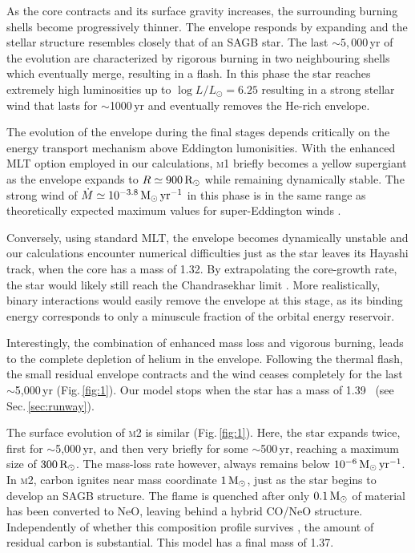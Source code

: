 \documentclass[../../main/thesis_msc.tex]{subfiles}
\begin{document}
As the core contracts and its surface gravity increases, the surrounding burning shells become progressively thinner. The envelope responds by expanding  and the stellar structure resembles closely that of an SAGB star.
The last $\sim 5,000$\,yr of the evolution are characterized by rigorous burning in two neighbouring shells which eventually merge, resulting in a  flash. In this phase the star reaches extremely high luminosities up to $\log{L/L_\odot = 6.25}$ resulting in a strong stellar wind that lasts for $\sim$1000\,yr and eventually removes the He-rich envelope.

The evolution of the envelope during the final stages 
depends critically on the energy transport mechanism above Eddington lumonisities. With the enhanced MLT option 
employed in our calculations, \textsc{m1} briefly 
becomes a yellow supergiant as the envelope  expands to $R\simeq 900\mathrm{\,R_\odot}$ while remaining dynamically stable.
The strong wind of $\dot{M}\simeq10^{-3.8}\mathrm{\,M_{\odot}\,yr^{-1}}$ in this phase is in the same range as theoretically expected maximum values for super-Eddington winds \citep[][]{Owocki:2004zz,Smith2006}.
%

Conversely, using standard MLT, the envelope becomes dynamically unstable and our calculations encounter numerical difficulties just as the star leaves its Hayashi track, when the core has a mass of 1.32\msun.
By extrapolating the core-growth rate, the star would likely still reach the  Chandrasekhar limit \citep[see ][for a similar conclusion]{Woosley:2019sdf}. 
More realistically, binary interactions would easily remove the envelope at this stage, as its binding energy corresponds to only a minuscule fraction of the orbital energy reservoir. 

Interestingly, the combination of enhanced mass loss and vigorous burning, leads to the complete depletion of helium in the envelope. 
Following the thermal flash, the small residual envelope contracts and the wind ceases completely for the last $\sim$5,000\,yr (Fig.\,\ref{fig:1}). Our model stops when the star has a mass of 1.39\msun~ (see Sec.\,\ref{sec:runway}).  

The surface evolution of \textsc{m2} is similar (Fig.\,\ref{fig:1}). Here, 
the star expands twice, first for $\sim$5,000\,yr, and then very briefly for some 
$\sim$500\,yr, reaching a maximum size of $300\mathrm{\,R_\odot}$. The mass-loss rate however, always remains 
below $10^{-6}\mathrm{\,M_{\odot}\,yr^{-1}}$. In \textsc{m2}, carbon ignites near mass coordinate $1\mathrm{\,M_\odot}$, 
just as the star begins to develop an SAGB structure. The flame is quenched after only 
$0.1\mathrm{\,M_\odot}$ of material has been converted to NeO, leaving behind a hybrid CO/NeO structure. Independently of whether this composition profile survives \citep{brooks2017}, the amount of residual  carbon is substantial. This model has a final mass of 1.37\msun. 
\end{document}
